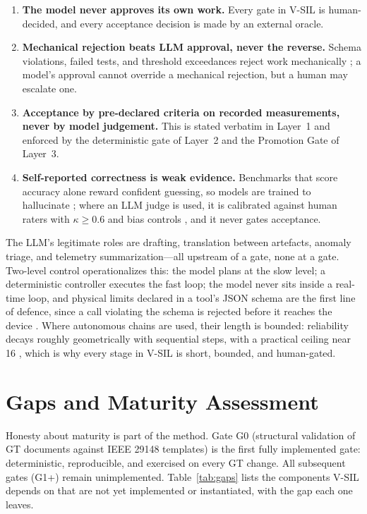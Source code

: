 \documentclass[11pt,a4paper]{article}
\begin{document}
\begin{enumerate}[label=\textbf{G\arabic*.}]
  \item \textbf{The model never approves its own work.} Every gate in V-SIL is human-decided,
    and every acceptance decision is made by an external oracle.
  \item \textbf{Mechanical rejection beats LLM approval, never the reverse.} Schema violations,
    failed tests, and threshold exceedances reject work mechanically
    \cite{mcp2025,tooluse2026}; a model's approval cannot override a mechanical rejection, but a
    human may escalate one.
  \item \textbf{Acceptance by pre-declared criteria on recorded measurements, never by model
    judgement.} This is stated verbatim in Layer~1 and enforced by the deterministic gate of
    Layer~2 and the Promotion Gate of Layer~3.
  \item \textbf{Self-reported correctness is weak evidence.} Benchmarks that score accuracy alone
    reward confident guessing, so models are trained to hallucinate \cite{kalai2026}; where an
    LLM judge is used, it is calibrated against human raters with $\kappa \geq 0.6$ and bias
    controls \cite{futureagi2026,judge2026}, and it never gates acceptance.
\end{enumerate}

The LLM's legitimate roles are drafting, translation between artefacts, anomaly triage, and
telemetry summarization---all upstream of a gate, none at a gate. Two-level control operationalizes
this: the model plans at the slow level; a deterministic controller executes the fast loop; the
model never sits inside a real-time loop, and physical limits declared in a tool's JSON schema are
the first line of defence, since a call violating the schema is rejected before it reaches the
device \cite{tooluse2026,mcp2025}. Where autonomous chains are used, their length is bounded:
reliability decays roughly geometrically with sequential steps, with a practical ceiling near 16
\cite{mittal2026}, which is why every stage in V-SIL is short, bounded, and human-gated.

\section{Gaps and Maturity Assessment}
\label{sec:gaps}

Honesty about maturity is part of the method. Gate G0 (structural validation of GT documents
against IEEE 29148 templates) is the first fully implemented gate: deterministic, reproducible,
and exercised on every GT change. All subsequent gates (G1+) remain unimplemented.
Table~\ref{tab:gaps} lists the components V-SIL depends on that are not yet implemented or
instantiated, with the gap each one leaves.
\end{document}
